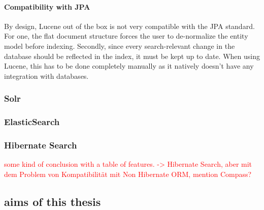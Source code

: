 \paragraph{Compatibility with JPA}
By design, Lucene out of the box is not very compatible with the JPA standard. For one, the flat document structure forces the user to de-normalize the entity model before indexing. Secondly, since every search-relevant change in the database should be reflected in the index, it must be kept up to date. When using Lucene, this has to be done completely manually as it natively doesn't have any integration with databases.

\subsubsection{Solr}

\subsubsection{ElasticSearch}

\subsubsection{Hibernate Search}

\textcolor{red}{some kind of conclusion with a table of features. -> Hibernate Search, aber mit dem Problem von Kompatibilität mit Non Hibernate ORM, mention Compass?}

\subsection{aims of this thesis}